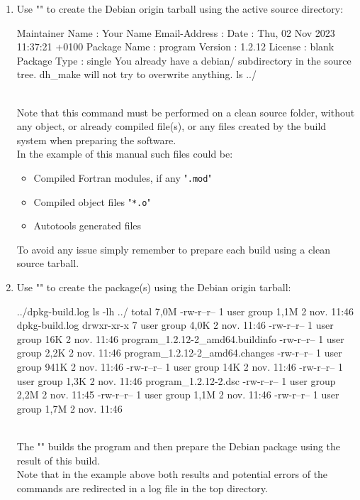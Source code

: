 \begin{enumerate}
\item Use "" to create the Debian origin tarball using the active source directory:
{\footnotesize{
\begin{scripti}
  
Maintainer Name     : Your Name
Email-Address       : \email
Date                : Thu, 02 Nov 2023 11:37:21 +0100
Package Name        : program
Version             : 1.2.12
License             : blank
Package Type        : single
You already have a debian/ subdirectory in the source tree.
dh\_make will not try to overwrite anything.
\uprompt{~} ls ../
  
\end{scripti}
}}
\\[-0.75cm]
\noindent Note that this command must be performed on a clean source folder, without any object, or already compiled file(s), or any files created by the build system when preparing the software. \\ 
In the example of this manual such files could be:
\begin{itemize}
\item Compiled Fortran modules, if any "\texttt{.mod}"
\item Compiled object files "\texttt{*.o}" 
\item Autotools generated files
\end{itemize}
To avoid any issue simply remember to prepare each build using a clean source tarball.  
\item Use "" to create the package(s) using the Debian origin tarball:
{\footnotesize{
\begin{scripti}
  \bad{>&} ../dpkg-build.log
 ls -lh ../
total 7,0M
-rw-r--r-- 1 user group 1,1M  2 nov.  11:46 dpkg-build.log
drwxr-xr-x 7 user group 4,0K  2 nov.  11:46 
-rw-r--r-- 1 user group  16K  2 nov.  11:46 program\_1.2.12-2\_amd64.buildinfo
-rw-r--r-- 1 user group 2,2K  2 nov.  11:46 program\_1.2.12-2\_amd64.changes
-rw-r--r-- 1 user group 941K  2 nov.  11:46 
-rw-r--r-- 1 user group  14K  2 nov.  11:46 
-rw-r--r-- 1 user group 1,3K  2 nov.  11:46 program\_1.2.12-2.dsc
-rw-r--r-- 1 user group 2,2M  2 nov.  11:45 
-rw-r--r-- 1 user group 1,1M  2 nov.  11:46 
-rw-r--r-- 1 user group 1,7M  2 nov.  11:46 
\end{scripti}	
}}
\\[-0.5cm]
\noindent The "" builds the program and then prepare the Debian package using the result of this build. \\
Note that in the example above both results and potential errors of the commands are redirected in a log file in the top directory. \\
\end{enumerate}
